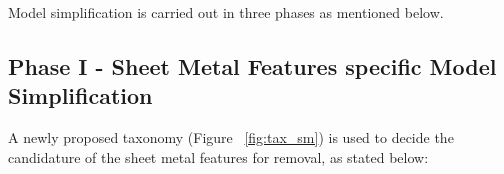 \bigskip

Model simplification is carried out in three phases as mentioned below.

\subsection{Phase I - Sheet Metal Features specific Model Simplification}\label{ph1}

A newly proposed taxonomy (Figure ~\ref{fig:tax_sm}) is used to decide the candidature of the sheet metal features for removal, as stated below:


